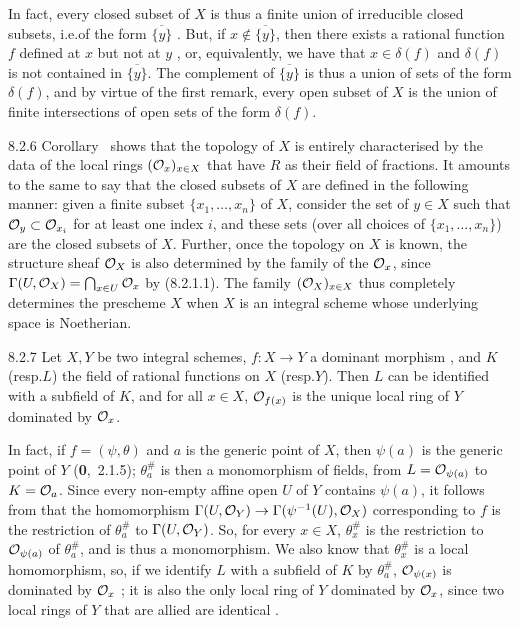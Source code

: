 In fact, every closed subset of $X$ is thus a finite union of irreducible closed
subsets, i.e.of the form $\overline{\{y\}}$ . But, if
$x\not\in\overline{\{y\}}$, then there exists a rational function $f$ defined at
$x$ but not at $y$ , or, equivalently, we have that $x\in\delta(f)$
and $\delta(f)$ is not contained in $\overline{\{y\}}$. The complement  of
$\overline{\{y\}}$ is thus a union of sets of the form $\delta(f)$, and by
virtue of the first remark, every open subset of $X$ is the union of finite
intersections of open sets of the form $\delta(f)$.

\begin{env}{8.2.6}
\label{env-1.8.2.6}
Corollary~ shows that the topology of $X$ is
entirely characterised by the data of the local rings $(\mathcal{O}_x)_{x\in X}$ that
have $R$ as their field of fractions. It amounts to the same to say that the
closed subsets of $X$ are defined in the following manner: given a finite subset
$\{x_1,\ldots,x_n\}$ of $X$, consider the set of $y\in X$ such that
$\mathcal{O}_y\subset\mathcal{O}_{x_i}$ for at least one index $i$, and these sets (over all
choices of $\{x_1,\ldots,x_n\}$) are the closed subsets of $X$. Further, once
the topology on $X$ is known, the structure sheaf $\mathcal{O}_X$ is also determined by
the family of the $\mathcal{O}_x$, since $\Gamma(U,\mathcal{O}_X)=\bigcap_{x\in U}\mathcal{O}_x$ by
(8.2.1.1). The family $(\mathcal{O}_X)_{x\in X}$ thus completely determines the
prescheme $X$ when $X$ is an integral scheme whose underlying space is
Noetherian.
\end{env}

\begin{env}[Proposition]{8.2.7}
\label{prop-1.8.2.7}
Let $X,Y$ be two integral schemes, $f\colon X\to Y$ a dominant morphism
, and $K$ (resp.$L$) the field of rational
functions on $X$ (resp.$Y$). Then $L$ can be identified with a subfield of
$K$, and for all $x\in X$, $\mathcal{O}_{f(x)}$ is the unique local ring of $Y$ dominated
by $\mathcal{O}_x$.
\end{env}

In fact, if $f=(\psi,\theta)$ and $a$ is the generic point of $X$, then
$\psi(a)$ is the generic point of $Y$ (\textbf{0},~2.1.5); $\theta_a^\#$ is then
a monomorphism of fields, from $L=\mathcal{O}_{\psi(a)}$ to $K=\mathcal{O}_a$. Since every
non-empty affine open $U$ of $Y$ contains $\psi(a)$, it follows from
 that the homomorphism $\Gamma(U,\mathcal{O}_Y)\to\Gamma(\psi^{-1}(U),\mathcal{O}_X)$
corresponding to $f$ is the restriction of $\theta_a^\#$ to $\Gamma(U,\mathcal{O}_Y)$.
So, for every $x\in X$, $\theta_x^\#$ is the restriction to $\mathcal{O}_{\psi(a)}$ of
$\theta_a^\#$, and is thus a monomorphism. We also know that $\theta_x^\#$ is a
local homomorphism, so, if we identify $L$ with a subfield of $K$ by
$\theta_a^\#$, $\mathcal{O}_{\psi(x)}$ is dominated by $\mathcal{O}_x$ ; it is also
the only local ring of $Y$ dominated by $\mathcal{O}_x$, since two local rings of $Y$
that are allied are identical .

